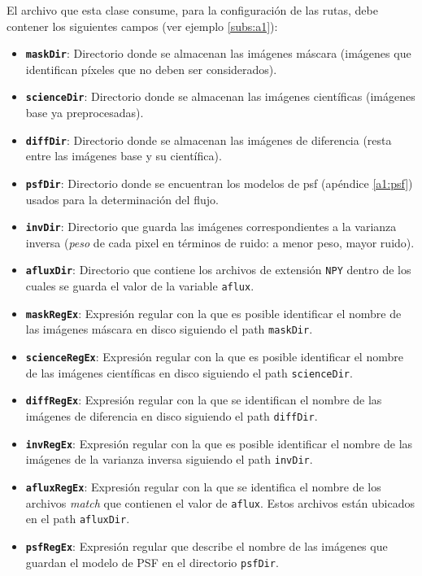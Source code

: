 El archivo que esta clase consume, para la configuraci\'on de las rutas, debe contener los siguientes campos (ver ejemplo \ref{subs:a1}):
\begin{itemize}
\item \textbf{\texttt{maskDir}}: Directorio donde se almacenan las im\'agenes m\'ascara (im\'agenes que identifican p\'ixeles que no deben ser considerados).
\item \textbf{\texttt{scienceDir}}: Directorio donde se almacenan las im\'agenes cient\'ificas (im\'agenes base ya preprocesadas).
\item \textbf{\texttt{diffDir}}: Directorio donde se almacenan las im\'agenes de diferencia (resta entre las im\'agenes base y su cient\'ifica).
\item \textbf{\texttt{psfDir}}: Directorio donde se encuentran los modelos de psf (ap\'endice \ref{a1:psf}) usados para la determinaci\'on del flujo.
\item \textbf{\texttt{invDir}}: Directorio que guarda las im\'agenes correspondientes a la varianza inversa (\textit{peso} de cada pixel en t\'erminos de ruido: a menor peso, mayor ruido).
\item \textbf{\texttt{afluxDir}}: Directorio que contiene los archivos de extensi\'on \texttt{NPY} dentro de los cuales se guarda el valor de la variable \texttt{aflux}.
\item \textbf{\texttt{maskRegEx}}: Expresi\'on regular con la que es posible identificar el nombre de las im\'agenes m\'ascara en disco siguiendo el path \texttt{maskDir}.
\item \textbf{\texttt{scienceRegEx}}: Expresi\'on regular con la que es posible identificar el nombre de las im\'agenes cient\'ificas en disco siguiendo el path \texttt{scienceDir}.
\item \textbf{\texttt{diffRegEx}}: Expresi\'on regular con la que se identifican el nombre de las im\'agenes de diferencia en disco siguiendo el path \texttt{diffDir}.
\item \textbf{\texttt{invRegEx}}: Expresi\'on regular con la que es posible identificar el nombre de las im\'agenes de la varianza inversa siguiendo el path \texttt{invDir}.
\item \textbf{\texttt{afluxRegEx}}: Expresi\'on regular con la que se identifica el nombre de los archivos \textit{match} que contienen el valor de \texttt{aflux}. Estos archivos est\'an ubicados en el path \texttt{afluxDir}.
\item \textbf{\texttt{psfRegEx}}: Expresi\'on regular que describe el nombre de las im\'agenes que guardan el modelo de PSF en el directorio \texttt{psfDir}.
\end{itemize}


